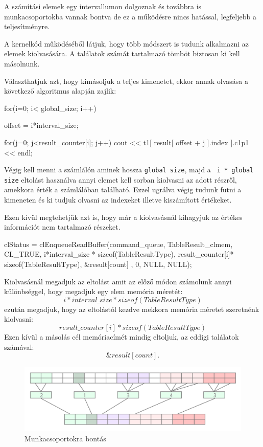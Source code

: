 A számítási elemek egy intervallumon dolgoznak és továbbra is munkacsoportokba vannak bontva de ez a működésre nincs hatással, legfeljebb a teljesítményre.

A kernelkód működéséből látjuk, hogy több módszert is tudunk alkalmazni az elemek kiolvasására. A találatok számát tartalmazó tömböt biztosan ki kell másolnunk.

Választhatjuk azt, hogy kimásoljuk a teljes kimenetet, ekkor annak olvasása a következő algoritmus alapján zajlik:
\begin{python}
for(i=0; i< global_size; i++)
{
  offset = i*interval_size;
  
  for(j=0; j<result_counter[i]; j++)
  cout << t1[ result[ offset + j ].index ].c1p1 << endl;
}
\end{python}
Végig kell menni a számlálón aminek hossza \texttt{global size}, majd a \texttt{ i * global size} eltolást használva annyi elemet kell sorban kiolvasni az adott részről, amekkora érték a számlálóban található. Ezzel ugrálva végig tudunk futni a kimeneten és ki tudjuk olvasni az indexeket illetve kiszámított értékeket.

Ezen kívül megtehetjük azt is, hogy már a kiolvasásnál kihagyjuk az értékes információt nem tartalmazó részeket.
\begin{python}
clStatus = clEnqueueReadBuffer(command_queue, TableResult_clmem, CL_TRUE, 
	i*interval_size * sizeof(TableResultType),
	result_counter[i]* sizeof(TableResultType), 
	&result[count]  , 0, NULL, NULL);
\end{python}

Kiolvasásnál megadjuk az eltolást amit az előző módon számolunk annyi különbséggel, hogy megadjuk egy elem memória méretét:
$$i * interval\_size * sizeof(TableResultType)$$ezután megadjuk, hogy az eltolástól kezdve mekkora memória méretet szeretnénk kiolvasni: $$result\_counter[i] * sizeof(TableResultType)$$Ezen kívül a másolás cél memóriacímét mindig eltoljuk, az eddigi találatok számával: $$\&result[count].$$

\begin{figure}[h!]
\centering
\includegraphics[width=\textwidth]{images/kimasol.png}
\caption{Munkacsoportokra bontás}
\label{fig:opencl}
\end{figure}

